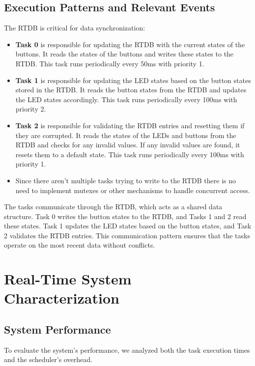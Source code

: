 \documentclass[a4paper,12pt]{article}
\begin{document}
\subsection{Execution Patterns and Relevant Events}
The RTDB is critical for data synchronization:
\begin{itemize}
    \item \textbf{Task 0} is responsible for updating the RTDB with the current states of the buttons. It reads the states of the buttons and writes these states to the RTDB. This task runs periodically every 50ms with priority 1.
    \item \textbf{Task 1} is responsible for updating the LED states based on the button states stored in the RTDB. It reads the button states from the RTDB and updates the LED states accordingly. This task runs periodically every 100ms with priority 2.
    \item \textbf{Task 2} is responsible for validating the RTDB entries and resetting them if they are corrupted. It reads the states of the LEDs and buttons from the RTDB and checks for any invalid values. If any invalid values are found, it resets them to a default state. This task runs periodically every 100ms with priority 1.

    \item Since there aren't multiple tasks trying to write to the RTDB there is no need to implement mutexes or other mechanisms to handle concurrent access.
\end{itemize}


The tasks communicate through the RTDB, which acts as a shared data structure. Task 0 writes the button states to the RTDB, and Tasks 1 and 2 read these states. Task 1 updates the LED states based on the button states, and Task 2 validates the RTDB entries. This communication pattern ensures that the tasks operate on the most recent data without conflicts.

\section{Real-Time System Characterization}
\subsection{System Performance}
To evaluate the system's performance, we analyzed both the task execution times and the scheduler's overhead.
\end{document}
